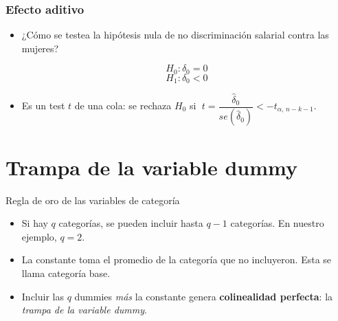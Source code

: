 \documentclass{beamer}
\begin{document}
\begin{frame}
\frametitle{Efecto aditivo}

\begin{itemize}
    \item ¿Cómo se testea la hipótesis nula de no discriminación salarial contra las mujeres?

        \[H_0: \delta_0 = 0\]
        \[H_1: \delta_0 < 0\]
    \item Es un test $t$ de una cola: se rechaza $H_0$ si $\; t=\dfrac{\hat\delta_0}{se(\hat\delta_0)} < -t_{\alpha,\,n-k-1}$.
\end{itemize}

\end{frame}

\section{Trampa de la variable dummy}

\begin{frame}{Regla de oro de las variables de categoría}
\begin{itemize}

    \item Si hay $q$ categorías, se pueden incluir hasta $q - 1$ categorías. En nuestro ejemplo, $q = 2$.
    \item La constante toma el promedio de la categoría que no incluyeron. Esta se llama categoría base.
    \item Incluir las $q$ dummies \emph{más} la constante genera \textbf{colinealidad perfecta}: la \textit{trampa de la variable dummy}.
\end{itemize}
\end{frame}
\end{document}
